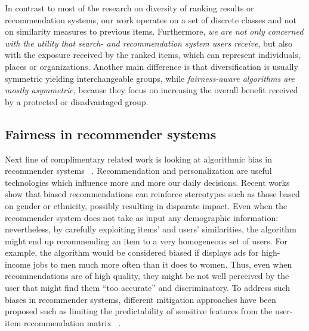 In contrast to most of the research on diversity of ranking results or recommendation systems, our work operates on a set of discrete classes and not on similarity measures to previous items.
%
Furthermore, \emph{we are not only concerned with the utility that search- and recommendation system users receive}, but also with the exposure received by the ranked items, which can represent individuals, places or organizations.
%
Another main difference is that diversification is usually symmetric yielding interchangeable groups, while \emph{fairness-aware algorithms are mostly asymmetric}, because they focus on increasing the overall benefit received by a protected or disadvantaged group.

\subsection{Fairness in recommender systems}

Next line of complimentary related work is looking at algorithmic bias in recommender systems ~\cite{chakraborty2019equality, ekstrand2021exploring, jannach2015recommenders, burke2018balanced, kamishima2018recommendation, steck2018calibrated, yao2017beyond, zhu2018fairness, edizel2020fairecsys}. Recommendation and personalization are
useful technologies which influence more and more our
daily decisions. Recent works show that biased recommendations can reinforce stereotypes
such as those based on gender or ethnicity, possibly resulting in disparate impact. Even when the recommender system does not take as input any demographic information: nevertheless, by carefully exploiting items' and users'
similarities, the algorithm might end up recommending
an item to a very homogeneous set of users. For example, the algorithm would be considered biased if 
displays ads for high-income jobs to men much more
often than it does to women. Thus, even when recommendations are of high quality, they might be not
well perceived by the user that might find them “too
accurate” and discriminatory. To address such biases in recommender systems, different mitigation approaches have been proposed such as
limiting the predictability of sensitive features from the
user-item recommendation matrix ~\cite{kamishima2018recommendation, edizel2020fairecsys}.

